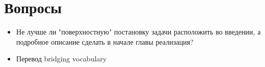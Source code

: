 \documentclass[12pt,a4paper,oneside]{extarticle}
\begin{document}
    \section{Вопросы}
        \begin{itemize}
            \item Не лучше ли "поверхностную" постановку задачи расположить во введении, а подробное описание сделать в начале главы реализация?
            \item Перевод bridging vocabulary
        \end{itemize}
    \clearpage


    
     \clearpage
    \tableofcontents \clearpage
     \clearpage
     \clearpage
     \clearpage
     \clearpage
     \clearpage
     \clearpage
     \clearpage
     \clearpage
     \clearpage
\end{document}
